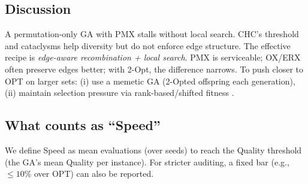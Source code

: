 \documentclass{article}
\begin{document}
\subsection{Discussion}
A permutation-only GA with PMX stalls without local search. CHC’s threshold and cataclysms help diversity but do not enforce edge structure. The effective recipe is \emph{edge-aware recombination + local search}. PMX is serviceable; OX/ERX often preserve edges better; with 2-Opt, the difference narrows. To push closer to OPT on larger sets: (i) use a memetic GA (2-Opted offspring each generation), (ii) maintain selection pressure via rank-based/shifted fitness \cite{potvin1996gaTSP,johnson1997tspLocal,nagata2013eax}.

\subsection{What counts as ``Speed''}
We define Speed as mean evaluations (over seeds) to reach the Quality threshold (the GA’s mean Quality per instance). For stricter auditing, a fixed bar (e.g., $\le 10\%$ over OPT) can also be reported.
\end{document}
